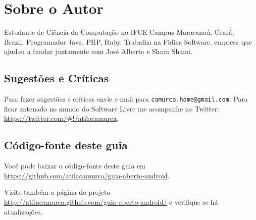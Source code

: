 \appendix

\chapter{Sobre o Autor}

Estudante de Ciência da Computação no IFCE Campus Maracanaú, Ceará, Brazil. Programador Java,
PHP, Ruby. Trabalha na Fidias Software, empresa que ajudou a fundar juntamente com José Alberto
e Shara Shami.

\section*{Sugestões e Críticas}

Para fazer sugestões e críticas envie e-mail para \texttt{camurca.home@gmail.com}. Para ficar antenado
no mundo do Software Livre me acompanhe no Twitter:\\ \url{https://twitter.com/#!/atilacamurca}.

\section*{Código-fonte deste guia}

Você pode baixar o código-fonte deste guia em\\ \url{https://github.com/atilacamurca/guia-aberto-android}.

Visite também a página do projeto\\ \url{http://atilacamurca.github.com/guia-aberto-android/} e verifique se
há atualizações.